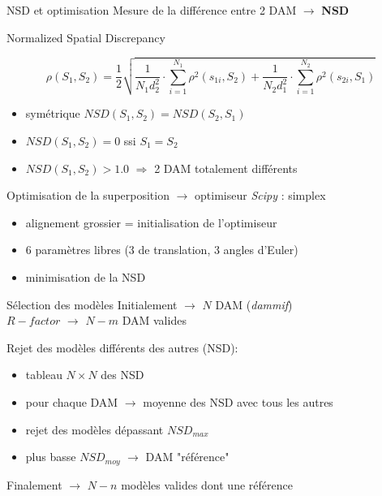 \documentclass{beamer}
\begin{document}
\begin{frame}{NSD et optimisation}
Mesure de la diff\'erence entre 2 DAM $\longrightarrow$ \textbf{NSD}\\
\begin{flushright} \small{Normalized Spatial Discrepancy} \end{flushright}
\[
\rho(S_{1},S_{2})= \frac{1}{2} \sqrt {\frac{1}{N_{1}d_{2}^2} 
\cdot \sum\limits_{i=1}^{N_{1}} \rho^2(s_{1i}, S_{2}) + \frac{1}{N_{2}d_{1}^2} \cdot \sum\limits_{i=1}^{N_{2}} \rho^2(s_{2i}, S_{1})}
\]
\begin{itemize}
\item sym\'etrique $NSD(S_{1},S_{2}) = NSD(S_{2},S_{1})$
\item $NSD(S_{1},S_{2}) = 0$ ssi $S_{1} = S_{2}$
\item $NSD(S_{1},S_{2}) > 1.0$ $\Rightarrow$ 2 DAM totalement diff\'erents
\end{itemize}

\vspace{0.1cm}

Optimisation de la superposition $\longrightarrow$ optimiseur \textit{Scipy} : simplex
\begin{itemize}
\item alignement grossier = initialisation de l'optimiseur
\item 6 param\`etres libres (3 de translation, 3 angles d'Euler)
\item minimisation de la NSD
\end{itemize}

\end{frame}

\begin{frame}{S\'election des mod\`eles}
Initialement $\longrightarrow$ $N$ DAM (\textit{dammif})\\
$R-factor$ $\longrightarrow$ $N-m$ DAM valides\\

\vspace{0.3cm}

Rejet des mod\`eles diff\'erents des autres (NSD):
\begin{itemize}
\item tableau $N \times N$ des NSD
\item pour chaque DAM $\rightarrow$ moyenne des NSD avec tous les autres
\item rejet des mod\`eles d\'epassant $NSD_{max}$
\item plus basse $NSD_{moy}$ $\rightarrow$ DAM "r\'ef\'erence"
\end{itemize}

\vspace{0.3cm}

Finalement $\longrightarrow$ $N-n$ mod\`eles valides dont une r\'ef\'erence

\end{frame}
\end{document}
